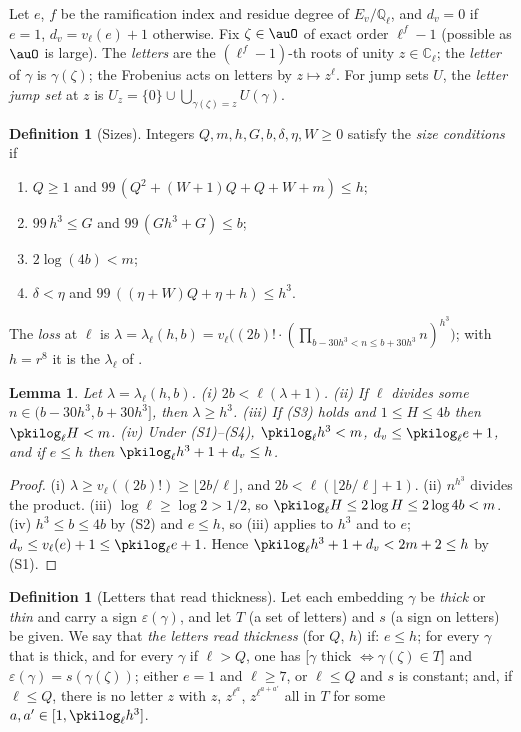 \documentclass[10pt]{amsart}
\newtheorem{lemma}[theorem]{Lemma}
\theoremstyle{definition}
\newtheorem{definition}[theorem]{Definition}
\theoremstyle{remark}
\newcommand{\C}{\mathbb C}
\newcommand{\Q}{\mathbb Q}
\begin{document}
Let $e$, $f$ be the ramification index and residue degree of $E_v/\Q_\ell$, and $d_v=0$ if $e=1$,
$d_v=v_\ell(e)+1$ otherwise. Fix $\zeta\in\auO$ of exact order $\ell^f-1$ (possible as $\auO$ is
large). The \emph{letters} are the $(\ell^f-1)$-th roots of unity $z\in\C_\ell$; the \emph{letter}
of $\gamma$ is $\gamma(\zeta)$; the Frobenius acts on letters by $z\mapsto z^\ell$. For jump sets
$U$, the \emph{letter jump set} at $z$ is $U_z=\{0\}\cup\bigcup_{\gamma(\zeta)=z}U(\gamma)$.

\begin{definition}[Sizes]\label{pki:def-sizes}
Integers $Q,m,h,G,b,\delta,\eta,W\ge0$ satisfy the \emph{size conditions} if
\begin{enumerate}
\item[(S1)] $Q\ge1$ and $99\,(Q^2+(W+1)Q+Q+W+m)\le h$;
\item[(S2)] $99\,h^3\le G$ and $99\,(Gh^3+G)\le b$;
\item[(S3)] $2\log(4b)<m$;
\item[(S4)] $\delta<\eta$ and $99\,((\eta+W)Q+\eta+h)\le h^3$.
\end{enumerate}
The \emph{loss} at $\ell$ is $\lambda=\lambda_\ell(h,b)=v_\ell\bigl((2b)!\cdot(\prod_{b-30h^3<n\le
b+30h^3}n)^{h^3}\bigr)$; with $h=r^8$ it is the $\lambda_\ell$ of {\cite[\S2.1]{P55}}.
\end{definition}

\begin{lemma}\label{pki:elem}
Let $\lambda=\lambda_\ell(h,b)$. (i) $2b<\ell(\lambda+1)$. (ii) If $\ell$ divides some
$n\in(b-30h^3,b+30h^3]$, then $\lambda\ge h^3$. (iii) If (S3) holds and $1\le H\le4b$ then
$\pkilog_\ell H<m$. (iv) Under (S1)--(S4), $\pkilog_\ell h^3<m$, $d_v\le\pkilog_\ell e+1$, and if
$e\le h$ then $\pkilog_\ell h^3+1+d_v\le h$.
\end{lemma}

\begin{proof}
(i) $\lambda\ge v_\ell((2b)!)\ge\lfloor2b/\ell\rfloor$, and $2b<\ell(\lfloor2b/\ell\rfloor+1)$.
(ii) $n^{h^3}$ divides the product. (iii) $\log\ell\ge\log2>1/2$, so $\pkilog_\ell H\le2\log
H\le2\log 4b<m$. (iv) $h^3\le b\le4b$ by (S2) and $e\le h$, so (iii) applies to $h^3$ and to $e$;
$d_v\le v_\ell(e)+1\le\pkilog_\ell e+1$. Hence $\pkilog_\ell h^3+1+d_v<2m+2\le h$ by (S1).
\end{proof}

\begin{definition}[Letters that read thickness]\label{pki:def-reads}
Let each embedding $\gamma$ be \emph{thick} or \emph{thin} and carry a sign $\varepsilon(\gamma)$, and
let $T$ (a set of letters) and $s$ (a sign on letters) be given. We say that \emph{the letters read
thickness} (for $Q$, $h$) if: $e\le h$; for every $\gamma$ that is thick, and for every $\gamma$ if
$\ell>Q$, one has [$\gamma$ thick $\Leftrightarrow\gamma(\zeta)\in T$] and
$\varepsilon(\gamma)=s(\gamma(\zeta))$; either $e=1$ and $\ell\ge7$, or $\ell\le Q$ and $s$ is
constant; and, if $\ell\le Q$, there is no letter $z$ with $z$, $z^{\ell^{a}}$, $z^{\ell^{a+a'}}$ all
in $T$ for some $a,a'\in[1,\pkilog_\ell h^3]$.
\end{definition}
\end{document}
